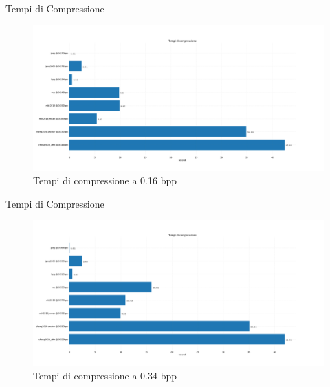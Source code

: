     \begin{frame}{Tempi di Compressione}
        \begin{figure}[t!]
            \centering
            \includegraphics[width=1\textwidth]{Immagini/METRICS/times@0.16bpp.png}
            \caption{Tempi di compressione a 0.16 bpp}
            \label{fig:times16}
        \end{figure}
    \end{frame}
    \begin{frame}{Tempi di Compressione}
        \begin{figure}[t!]
            \centering
            \includegraphics[width=1\textwidth]{Immagini/METRICS/times@0.34bpp.png}
            \caption{Tempi di compressione a 0.34 bpp}
            \label{fig:times34}
        \end{figure}
    \end{frame}

